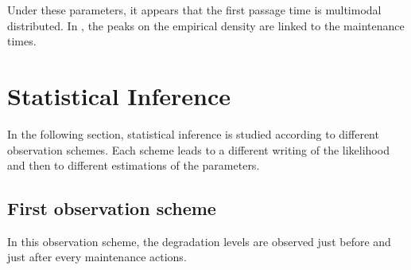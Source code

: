 Under these parameters, it appears that the first passage time is multimodal distributed. 
In , the peaks on the empirical density are linked to the maintenance times.









\section{Statistical Inference}
In the following section, statistical inference is studied according to different observation schemes. Each scheme leads to a different writing of the likelihood and then to different estimations of the parameters.

\subsection{First observation scheme}
In this observation scheme, the degradation levels are observed just before and just after every maintenance actions.
